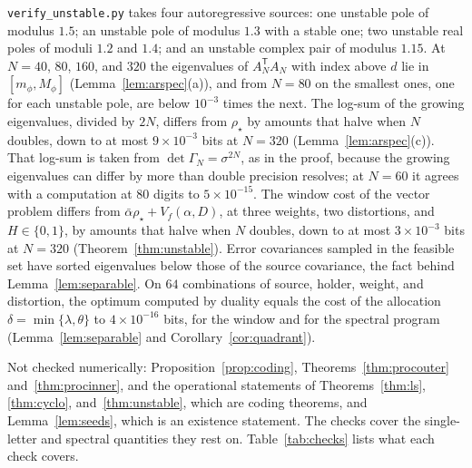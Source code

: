 \documentclass[11pt,onecolumn]{IEEEtran}
\begin{document}
\texttt{verify\_unstable.py} takes four autoregressive sources: one
unstable pole of modulus $1.5$; an unstable pole of modulus $1.3$ with a
stable one; two unstable real poles of moduli $1.2$ and $1.4$; and an
unstable complex pair of modulus $1.15$. At $N=40$, $80$, $160$, and
$320$ the eigenvalues of $A_N^{\mathsf T}A_N$ with index above $d$ lie in
$[m_\phi,M_\phi]$ (Lemma~\ref{lem:arspec}(a)), and from $N=80$ on the
smallest ones, one for each unstable pole, are below $10^{-3}$ times the
next. The log-sum of the growing eigenvalues, divided by $2N$, differs
from $\rho_\star$ by amounts that halve when $N$ doubles, down to at most
$9\times10^{-3}$ bits at $N=320$ (Lemma~\ref{lem:arspec}(c)). That log-sum
is taken from $\det\Gamma_N=\sigma^{2N}$, as in the proof, because the
growing eigenvalues can differ by more than double precision resolves;
at $N=60$ it agrees with a computation at $80$ digits to
$5\times10^{-15}$. The window cost of the vector problem differs from
$\bar\alpha\rho_\star+V_f(\alpha,D)$, at three weights, two distortions,
and $H\in\{0,1\}$, by amounts that halve when $N$ doubles, down to at
most $3\times10^{-3}$ bits at $N=320$ (Theorem~\ref{thm:unstable}).
Error covariances sampled in the feasible set have sorted eigenvalues
below those of the source covariance, the fact behind
Lemma~\ref{lem:separable}. On $64$ combinations of source, holder,
weight, and distortion, the optimum computed by duality equals the cost
of the allocation $\delta=\min\{\lambda,\theta\}$ to $4\times10^{-16}$ bits,
for the window and for the spectral program (Lemma~\ref{lem:separable}
and Corollary~\ref{cor:quadrant}).

Not checked numerically: Proposition~\ref{prop:coding},
Theorems~\ref{thm:procouter} and~\ref{thm:procinner}, and the
operational statements of Theorems~\ref{thm:ls}, \ref{thm:cyclo},
and~\ref{thm:unstable},
which are coding theorems, and Lemma~\ref{lem:seeds}, which is an
existence statement. The checks cover the single-letter and spectral
quantities they rest on. Table~\ref{tab:checks} lists what each check
covers.
\end{document}

